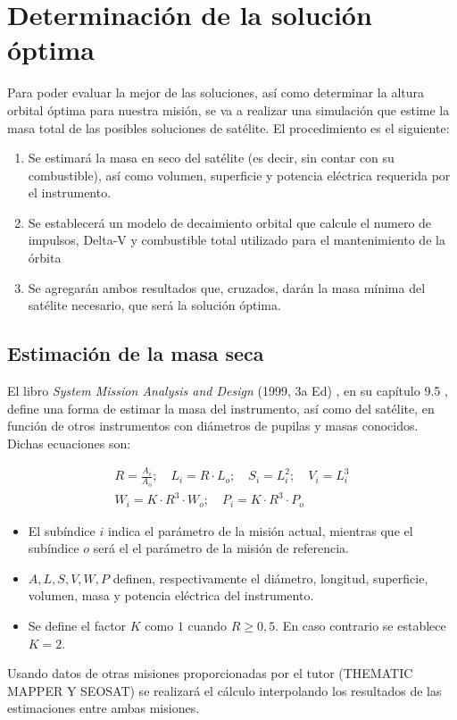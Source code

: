 \chapter{Determinación de la solución óptima}
\minitoc

Para poder evaluar la mejor de las soluciones, así como determinar la altura orbital óptima para nuestra misión, se va a realizar una simulación que estime la masa total de las posibles soluciones de satélite. 
El procedimiento es el siguiente:

\begin{enumerate}
    \item Se estimará la masa en seco del satélite (es decir, sin contar con su combustible), así como volumen, superficie y potencia eléctrica requerida por el instrumento. 
    \item Se establecerá un modelo de decaimiento orbital que calcule el numero de impulsos, Delta-V y combustible total utilizado para el mantenimiento de la órbita
    \item Se agregarán ambos resultados que, cruzados, darán la masa mínima del satélite necesario, que será la solución óptima.
\end{enumerate}

\newpage
\section{Estimación de la masa seca }

El libro \textit{System Mission Analysis and Design} (1999, 3a Ed) \cite{wertz1999smad}, en su capítulo 9.5 , define una forma de estimar la masa del instrumento, así como del satélite, en función de otros instrumentos con diámetros de pupilas y masas conocidos. Dichas ecuaciones son:

\begin{equation}
\begin{gathered}
R = \frac{A_i}{A_o}; \quad L_i = R \cdot L_o; \quad S_i = L_i^2; \quad V_i = L_i^3 \\
W_i = K \cdot R^3 \cdot W_o; \quad P_i = K \cdot R^3 \cdot P_o
\end{gathered}
\end{equation}

\begin{itemize}
    \item El subíndice $i$ indica el parámetro de la misión actual, mientras que el subíndice $o$ será el el parámetro de la misión de referencia. 
    \item $A, L, S, V, W, P$ definen, respectivamente el diámetro, longitud, superficie, volumen, masa y potencia eléctrica del instrumento.
    \item Se define el factor $K$ como $1$ cuando $R\geq 0,5$. En caso contrario se establece $K=2$.
\end{itemize}
Usando datos de otras misiones proporcionadas por el tutor (THEMATIC MAPPER Y SEOSAT) se realizará el cálculo interpolando los resultados de las estimaciones entre ambas misiones.

